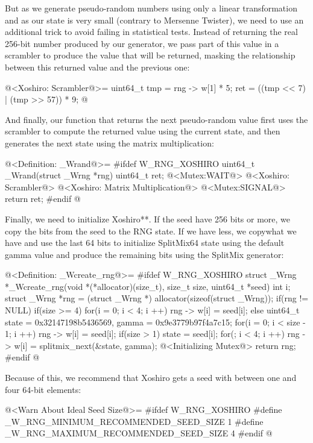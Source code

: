 But as we generate pseudo-random numbers using only a linear
transformation and as our state is very small (contrary to Mersenne
Twister), we need to use an additional trick to avoid failing in
statistical tests. Instead of returning the real 256-bit number
produced by our generator, we pass part of this value in a scrambler
to produce the value that will be returned, masking the relationship
between this returned value and the previous one:

\iniciocodigo
@<Xoshiro: Scrambler@>=
{
  uint64_t tmp = rng -> w[1] * 5;
  ret = ((tmp << 7) | (tmp >> 57)) * 9;
} 
@
\fimcodigo

And finally, our function that returns the next pseudo-random value
first uses the scrambler to compute the returned
value  using the current state, and then generates the
next state using the matrix multiplication:

\iniciocodigo
@<Definition: \_Wrand@>=
#ifdef W_RNG_XOSHIRO
uint64_t _Wrand(struct _Wrng *rng){
  uint64_t ret;
  @<Mutex:WAIT@>
  @<Xoshiro: Scrambler@>
  @<Xoshiro: Matrix Multiplication@>
  @<Mutex:SIGNAL@>
  return ret;
}
#endif
@
\fimcodigo

Finally, we need to initialize Xoshiro**. If the seed have 256 bits or
more, we copy the bits from the seed to the RNG state. If we have
less, we copywhat we have and use the last 64 bits to initialize
SplitMix64 state using the default gamma value and produce the
remaining bits using the SplitMix generator:

\iniciocodigo
@<Definition: \_Wcreate\_rng@>=
#ifdef W_RNG_XOSHIRO
struct _Wrng *_Wcreate_rng(void *(*allocator)(size_t), size_t size,
                           uint64_t *seed){
  int i;
  struct _Wrng *rng = (struct _Wrng *) allocator(sizeof(struct _Wrng));
  if(rng != NULL){
    if(size >= 4){
      for(i = 0; i < 4; i ++)
        rng -> w[i] = seed[i];
    }
    else{
      uint64_t state = 0x32147198b5436569, gamma = 0x9e3779b97f4a7c15;
      for(i = 0; i < size - 1; i ++)
        rng -> w[i] = seed[i];
      if(size > 1)
        state = seed[i];
      for(; i < 4; i ++)
        rng -> w[i] = splitmix_next(&state, gamma);
    }                           
    @<Initializing Mutex@>
  }
  return rng;
}
#endif
@
\fimcodigo

Because of this, we recommend that Xoshiro gets a seed with between
one and four 64-bit elements:

\iniciocodigo
@<Warn About Ideal Seed Size@>=
#ifdef W_RNG_XOSHIRO
#define _W_RNG_MINIMUM_RECOMMENDED_SEED_SIZE  1
#define _W_RNG_MAXIMUM_RECOMMENDED_SEED_SIZE  4
#endif
@
\fimcodigo


